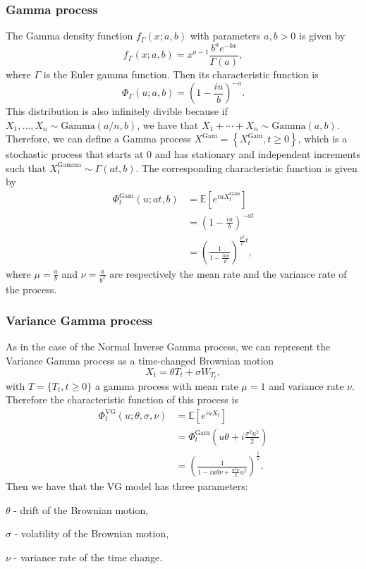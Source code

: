 \subsubsection*{Gamma process}
The Gamma density function $f_\Gamma(x;a,b)$ with parameters $a,b>0$ is given by
$$f_\Gamma (x;a,b) = x^{a-1}\frac{b^a e^{-bx}}{\Gamma(a)},$$
where $\Gamma$ is the Euler gamma function. Then its characteristic function is
$$\Phi_\Gamma(u;a,b)=\left(1-\frac{iu}{b}\right)^{-a}.$$
This distribution is also infinitely divible because if $X_1,\ldots,X_n\sim\text{Gamma}(a/n,b)$, we have that $X_1+\cdots+X_n\sim\text{Gamma}(a,b)$. Therefore, we can define a Gamma process $X^\text{Gam}=\left\{X_t^\text{Gam},t\geq0\right\}$, which is a stochastic process that starts at 0 and has stationary and independent increments such that $X_t^\text{Gamma}\sim\Gamma(at,b)$. The corresponding characteristic function is given by
\begin{align*}
\Phi_t^\text{Gam}(u;at,b) &=\mathbb{E}\left[e^{iuX_t^\text{Gam}}\right]\\
&= \left(1-\frac{iu}{b}\right)^{-at}\\
&= \left(\frac{1}{1-\frac{iu\nu}{\mu}}\right)^{\frac{\mu^2}{\nu}t},
\end{align*}
where $\mu=\frac{a}{b}$ and $\nu=\frac{a}{b^2}$ are respectively the mean rate and the variance rate of the process.

\subsubsection*{Variance Gamma process}
As in the case of the Normal Inverse Gamma process, we can represent the Variance Gamma process as a time-changed Brownian motion
$$X_t = \theta T_t +\sigma W_{T_t},$$
with $T=\{T_t,t\geq0\}$ a gamma process with mean rate $\mu=1$ and variance rate $\nu$. Therefore the characteristic function of this process is
\begin{align}\label{eq:VG_CF1}
\Phi_t^{\text{VG}}(u;\theta,\sigma,\nu)&=\mathbb{E}\left[e^{iuX_t}\right]\nonumber\\
&=\Phi_t^\text{Gam}\left(u\theta+i\frac{\sigma^2u^2}{2}\right)\nonumber\\
&= \left(\frac{1}{1-iu\theta\nu+\frac{\sigma^2\nu}{2}u^2}\right)^{\frac{t}{\nu}}.
\end{align}
Then we have that the VG model has three parameters:
\begin{my_list_item}
\item $\theta$ - drift of the Brownian motion,
\item $\sigma$ - volatility of the Brownian motion,
\item $\nu$ - variance rate of the time change.
\end{my_list_item}

